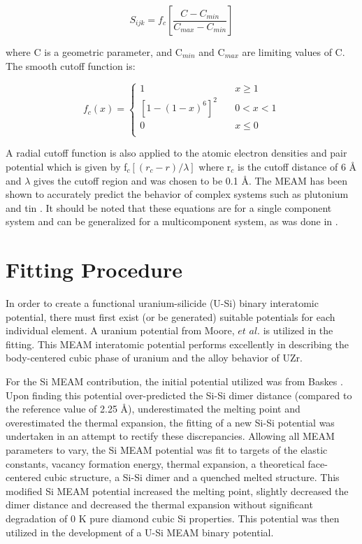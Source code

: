 \documentclass[review]{elsarticle}
\begin{document}
\begin{equation}
\label{eq:eqn15}
S_{ijk}= f_{c}\left[\frac{C-C_{min}}{C_{max}-C_{min}}\right]
\end{equation}

where C is a geometric parameter, and C$_{min}$ and C$_{max}$ are limiting values of C.  The smooth cutoff function is:

\begin{equation}
\label{eq:eqn16}
f_{c}(x) = \begin{cases}
    1       & \quad x \geq 1 \\
    [1-(1-x)^{6}]^{2}  & \quad 0 < x < 1\\
    0       & \quad x \leq 0\\
  \end{cases} 
\end{equation}

A radial cutoff function is also applied to the atomic electron densities and pair potential which is given by f$_{c}[(r_{c}-r)/\lambda]$ where r$_{c}$ is the cutoff distance of 6 {\AA } and $\lambda$ gives the cutoff region and was chosen to be 0.1 {\AA}.  The MEAM has been shown to accurately predict the behavior of complex systems such as plutonium \cite{baskes2000} and tin \cite{baskes1997}.  It should be noted that these equations are for a single component system and can be generalized for a multicomponent system, as was done in \cite{baskes2014}.  

\section{Fitting Procedure}
In order to create a functional uranium-silicide (U-Si) binary interatomic potential, there must first exist (or be generated) suitable potentials for each individual element.  A uranium potential from Moore, $\textit{et al.}$ \cite{moore2015} is utilized in the fitting.  This MEAM interatomic potential performs excellently in describing the body-centered cubic phase of uranium and the alloy behavior of UZr.   

For the Si MEAM contribution, the initial potential utilized was from Baskes \cite{baskes1992}.  Upon finding this potential over-predicted the Si-Si dimer distance (compared to the reference value of 2.25 \AA \cite{huber1979}), underestimated the melting point and overestimated the thermal expansion, the fitting of a new Si-Si potential was undertaken in an attempt to rectify these discrepancies.  Allowing all MEAM parameters to vary, the Si MEAM potential was fit to targets of the elastic constants, vacancy formation energy, thermal expansion, a theoretical face-centered cubic structure, a Si-Si dimer and a quenched melted structure.  This modified Si MEAM potential increased the melting point, slightly decreased the dimer distance and decreased the thermal expansion without significant degradation of 0 K pure diamond cubic Si properties.  This potential was then utilized in the development of a U-Si MEAM binary potential.  
\end{document}
